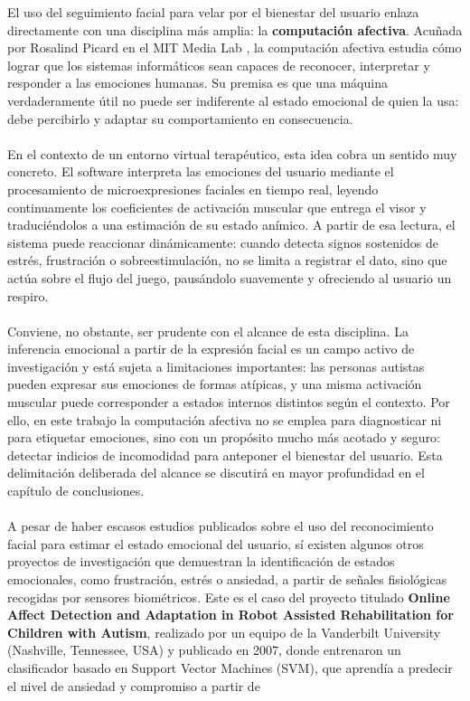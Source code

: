 \documentclass[12pt,twoside,titlepage]{report}
\begin{document}
El uso del seguimiento facial para velar por el bienestar del usuario enlaza directamente con una disciplina más amplia: la \textbf{computación afectiva}.
Acuñada por Rosalind Picard en el MIT Media Lab \parencite{picard1997}, la computación afectiva estudia cómo lograr que los sistemas informáticos sean capaces de reconocer, interpretar y responder a las emociones humanas.
Su premisa es que una máquina verdaderamente útil no puede ser indiferente al estado emocional de quien la usa: debe percibirlo y adaptar su comportamiento en consecuencia.\\
\\
En el contexto de un entorno virtual terapéutico, esta idea cobra un sentido muy concreto.
El software interpreta las emociones del usuario mediante el procesamiento de microexpresiones faciales en tiempo real, leyendo continuamente los coeficientes de activación muscular que entrega el visor y traduciéndolos a una estimación de su estado anímico.
A partir de esa lectura, el sistema puede reaccionar dinámicamente: cuando detecta signos sostenidos de estrés, frustración o sobreestimulación, no se limita a registrar el dato, sino que actúa sobre el flujo del juego, pausándolo suavemente y ofreciendo al usuario un respiro.\\
\\
Conviene, no obstante, ser prudente con el alcance de esta disciplina.
La inferencia emocional a partir de la expresión facial es un campo activo de investigación y está sujeta a limitaciones importantes: las personas autistas pueden expresar sus emociones de formas atípicas, y una misma activación muscular puede corresponder a estados internos distintos según el contexto.
Por ello, en este trabajo la computación afectiva no se emplea para diagnosticar ni para etiquetar emociones, sino con un propósito mucho más acotado y seguro: detectar indicios de incomodidad para anteponer el bienestar del usuario.
Esta delimitación deliberada del alcance se discutirá en mayor profundidad en el capítulo de conclusiones.
\\\\
A pesar de haber escasos estudios publicados sobre el uso del reconocimiento facial para estimar el estado emocional del usuario, sí existen algunos otros proyectos de investigación que demuestran la identificación de estados emocionales,
como frustración, estrés o ansiedad, a partir de señales fisiológicas recogidas por sensores biométricos. Este es el caso del proyecto titulado \textbf{Online Affect Detection and Adaptation in Robot Assisted Rehabilitation for Children with Autism}, realizado por un equipo de la Vanderbilt University (Nashville, Tennessee, USA) y publicado en 2007, donde entrenaron un clasificador basado en Support Vector Machines (SVM), que aprendía a predecir el nivel de ansiedad y compromiso a partir de
\end{document}
